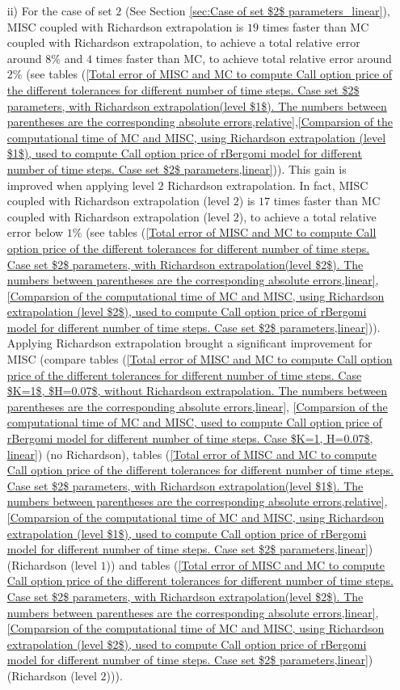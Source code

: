 \begin{enumerate}
			\item [ii)] For the case of set $2$ (See Section \ref{sec:Case of set $2$ parameters_linear}), MISC coupled with Richardson extrapolation is $19$ times faster than MC coupled with Richardson extrapolation, to achieve a total relative error around $8\%$ and $4$ times faster than MC, to achieve total relative error around $2\%$ (see tables (\ref{Total  error of MISC and MC to compute Call option price of the different tolerances for different number of time steps. Case set $2$ parameters, with Richardson extrapolation(level $1$). The numbers between parentheses are the corresponding absolute errors,relative},\ref{Comparsion of the computational time of  MC and MISC, using Richardson extrapolation (level $1$), used to compute Call option price of rBergomi model for different number of time steps. Case set $2$ parameters,linear})). This gain is improved when applying level $2$ Richardson extrapolation. In fact,  MISC coupled with Richardson extrapolation (level $2$) is $17$ times faster than MC coupled with Richardson extrapolation (level $2$), to achieve a total relative error below  $1\%$ (see  tables (\ref{Total  error of MISC and MC to compute Call option price of the different tolerances for different number of time steps. Case set $2$ parameters, with Richardson extrapolation(level $2$). The numbers between parentheses are the corresponding absolute errors,linear}, \ref{Comparsion of the computational time of  MC and MISC, using Richardson extrapolation (level $2$), used to compute Call option price of rBergomi model for different number of time steps. Case set $2$ parameters,linear})). Applying Richardson extrapolation brought a significant improvement for MISC (compare tables (\ref{Total error of MISC and MC to compute Call option price of the different tolerances for different number of time steps. Case $K=1$, $H=0.07$, without Richardson extrapolation. The numbers between parentheses are the corresponding absolute errors,linear}, \ref{Comparsion of the computational time of  MC and MISC, used to compute Call option price of rBergomi model for different number of time steps. Case $K=1, H=0.07$, linear}) (no Richardson), tables (\ref{Total  error of MISC and MC to compute Call option price of the different tolerances for different number of time steps. Case set $2$ parameters, with Richardson extrapolation(level $1$). The numbers between parentheses are the corresponding absolute errors,relative},\ref{Comparsion of the computational time of  MC and MISC, using Richardson extrapolation (level $1$), used to compute Call option price of rBergomi model for different number of time steps. Case set $2$ parameters,linear}) (Richardson (level $1$)) and  tables  (\ref{Total  error of MISC and MC to compute Call option price of the different tolerances for different number of time steps. Case set $2$ parameters, with Richardson extrapolation(level $2$). The numbers between parentheses are the corresponding absolute errors,linear}, \ref{Comparsion of the computational time of  MC and MISC, using Richardson extrapolation (level $2$), used to compute Call option price of rBergomi model for different number of time steps. Case set $2$ parameters,linear}) (Richardson (level $2$))).
		

\end{enumerate}
